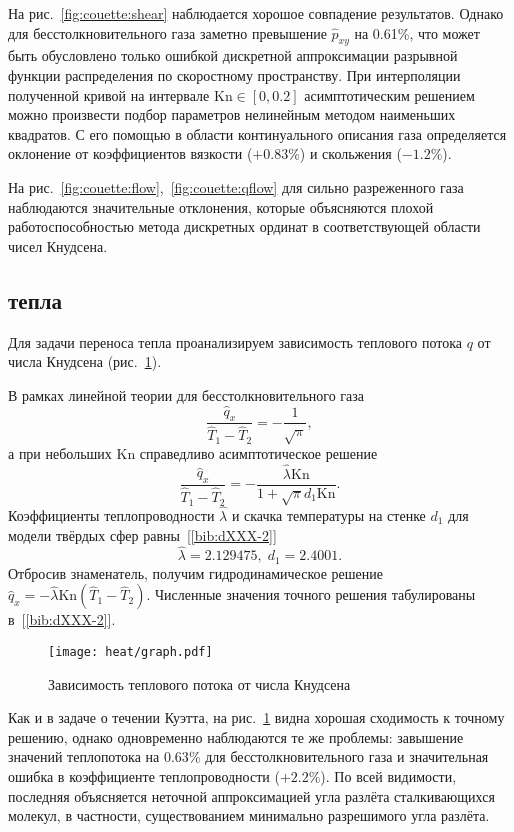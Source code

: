 \documentclass[english,russian,a4paper,12pt]{article}
\newcommand{\Kn}{\mathrm{Kn}}
\begin{document}
На рис.~\ref{fig:couette:shear} наблюдается хорошое совпадение результатов.
Однако для бесстолкновительного газа заметно превышение \(\hat{p}_{xy}\) на 0.61\%,
что может быть обусловлено только ошибкой дискретной аппроксимации разрывной функции распределения по скоростному пространству.
При интерполяции полученной кривой на интервале \(\Kn\in[0,0.2]\) асимптотическим решением 
можно произвести подбор параметров нелинейным методом наименьших квадратов.
С его помощью в области континуального описания газа определяется оклонение 
от коэффициентов вязкости (\(+0.83\%\)) и скольжения (\(-1.2\%\)).

На рис.~\ref{fig:couette:flow},~\ref{fig:couette:qflow} для сильно разреженного газа наблюдаются значительные отклонения,
которые объясняются плохой работоспособностью метода дискретных ординат в соответствующей области чисел Кнудсена.

\subsection*{ тепла}

Для задачи переноса тепла проанализируем зависимость теплового потока \(q\) от числа Кнудсена (рис.~\ref{fig:heat}).

В рамках линейной теории для бесстолкновительного газа
\[ \frac{\hat{q}_x}{\hat{T}_1-\hat{T}_2} = -\frac1{\sqrt{\pi}}, \]
а при небольших \(\Kn\) справедливо асимптотическое решение
\[ \frac{\hat{q}_x}{\hat{T}_1-\hat{T}_2} = -\frac{\hat{\lambda}\Kn}{1+\sqrt{\pi}d_1\Kn}. \]
Коэффициенты теплопроводности \(\hat{\lambda}\) и скачка температуры на стенке \(d_1\) для модели твёрдых сфер равны~[\ref{bib:dXXX-2}]
\[ \hat{\lambda} = 2.129475, \; d_1 = 2.4001. \]
Отбросив знаменатель, получим гидродинамическое решение \(\hat{q}_x = -\hat{\lambda}\Kn(\hat{T}_1-\hat{T}_2)\).
Численные значения точного решения табулированы в~[\ref{bib:dXXX-2}].

\begin{figure}
	\centering
	\texttt{[image: heat/graph.pdf]}
	\caption{Зависимость теплового потока от числа Кнудсена}\label{fig:heat}
\end{figure}

Как и в задаче о течении Куэтта, на рис.~\ref{fig:heat} видна хорошая сходимость к точному решению,
однако одновременно наблюдаются те же проблемы: завышение значений теплопотока на \(0.63\)\%
для бесстолкновительного газа и значительная ошибка в коэффициенте теплопроводности (\(+2.2\%\)).
По всей видимости, последняя объясняется неточной аппроксимацией угла разлёта сталкивающихся молекул,
в частности, существованием минимально разрешимого угла разлёта.
\end{document}

